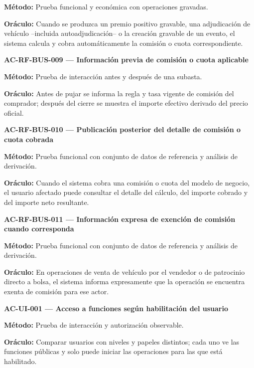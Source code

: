 \documentclass[10pt,letterpaper]{article}
\begin{document}
\textbf{Método:} Prueba funcional y económica con operaciones gravadas.\par
\textbf{Oráculo:} Cuando se produzca un premio positivo gravable, una adjudicación de vehículo --incluida autoadjudicación-- o la creación gravable de un evento, el sistema calcula y cobra automáticamente la comisión o cuota correspondiente.\par\vspace{0.45em}
\noindent\textbf{AC-RF-BUS-009 --- Información previa de comisión o cuota aplicable}\par
\textbf{Método:} Prueba de interacción antes y después de una subasta.\par
\textbf{Oráculo:} Antes de pujar se informa la regla y tasa vigente de comisión del comprador; después del cierre se muestra el importe efectivo derivado del precio oficial.\par\vspace{0.45em}
\noindent\textbf{AC-RF-BUS-010 --- Publicación posterior del detalle de comisión o cuota cobrada}\par
\textbf{Método:} Prueba funcional con conjunto de datos de referencia y análisis de derivación.\par
\textbf{Oráculo:} Cuando el sistema cobra una comisión o cuota del modelo de negocio, el usuario afectado puede consultar el detalle del cálculo, del importe cobrado y del importe neto resultante.\par\vspace{0.45em}
\noindent\textbf{AC-RF-BUS-011 --- Información expresa de exención de comisión cuando corresponda}\par
\textbf{Método:} Prueba funcional con conjunto de datos de referencia y análisis de derivación.\par
\textbf{Oráculo:} En operaciones de venta de vehículo por el vendedor o de patrocinio directo a bolsa, el sistema informa expresamente que la operación se encuentra exenta de comisión para ese actor.\par\vspace{0.45em}
\noindent\textbf{AC-UI-001 --- Acceso a funciones según habilitación del usuario}\par
\textbf{Método:} Prueba de interacción y autorización observable.\par
\textbf{Oráculo:} Comparar usuarios con niveles y papeles distintos; cada uno ve las funciones públicas y solo puede iniciar las operaciones para las que está habilitado.\par\vspace{0.45em}
\end{document}
